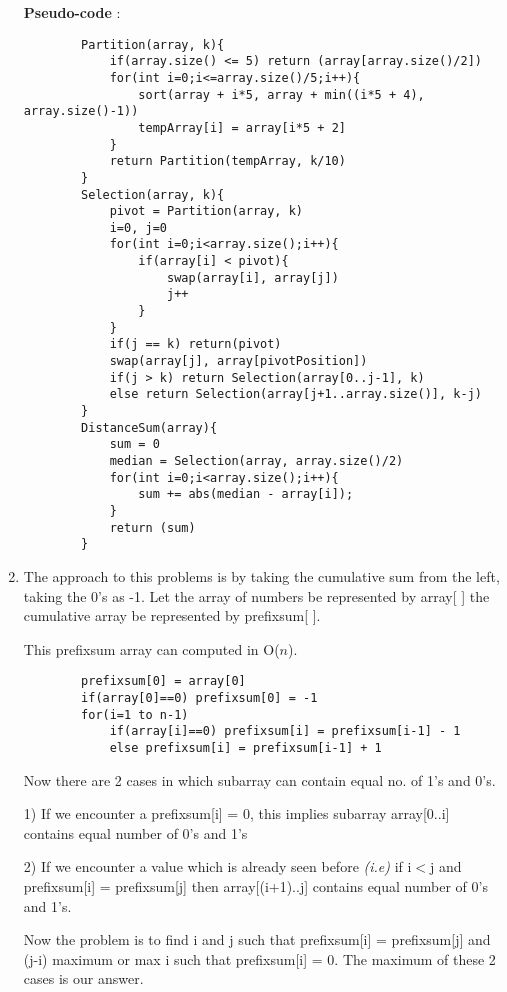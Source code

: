 \documentclass[12pt]{article}
\begin{document}
\begin{enumerate}
    \textbf{Pseudo-code} :
    \begin{verbatim}
        Partition(array, k){
            if(array.size() <= 5) return (array[array.size()/2])
            for(int i=0;i<=array.size()/5;i++){
                sort(array + i*5, array + min((i*5 + 4), array.size()-1))
                tempArray[i] = array[i*5 + 2]
            }
            return Partition(tempArray, k/10)
        }
        Selection(array, k){
            pivot = Partition(array, k)
            i=0, j=0
            for(int i=0;i<array.size();i++){
                if(array[i] < pivot){
                    swap(array[i], array[j])
                    j++
                }
            }
            if(j == k) return(pivot)
            swap(array[j], array[pivotPosition])
            if(j > k) return Selection(array[0..j-1], k)
            else return Selection(array[j+1..array.size()], k-j)
        }
        DistanceSum(array){
            sum = 0
            median = Selection(array, array.size()/2)
            for(int i=0;i<array.size();i++){
                sum += abs(median - array[i]);        
            }
            return (sum)
        }
    \end{verbatim}
    \item The approach to this problems is by taking the cumulative sum from the left, taking the 0's as -1. Let the array of numbers be represented by array[ ] the cumulative array be represented by prefixsum[ ].
    
    This prefixsum array can computed in O($n$).
    
    \begin{verbatim}
        prefixsum[0] = array[0]
        if(array[0]==0) prefixsum[0] = -1
        for(i=1 to n-1) 
            if(array[i]==0) prefixsum[i] = prefixsum[i-1] - 1
            else prefixsum[i] = prefixsum[i-1] + 1
    \end{verbatim}
    
    Now there are 2 cases in which subarray can contain equal no. of 1's and 0's.
    
    1) If we encounter a prefixsum[i] = 0, this implies subarray array[0..i] contains equal number of 0's and 1's
    
    2) If we encounter a value which is already seen before \textit{(i.e)} if i$<$j and prefixsum[i] = prefixsum[j] then array[(i+1)..j] contains equal number of 0's and 1's. 
    
    Now the problem is to find i and j such that prefixsum[i] = prefixsum[j] and (j-i) maximum or max i such that prefixsum[i] = 0. The maximum of these 2 cases is our answer.
    

\end{enumerate}
\end{document}
